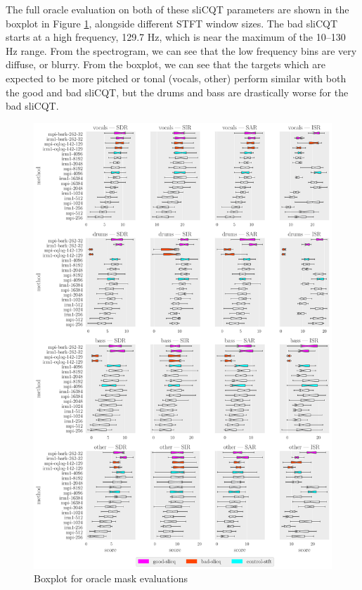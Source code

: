 \documentclass[report.tex]{subfiles}
\begin{document}
The full oracle evaluation on both of these sliCQT parameters are shown in the boxplot in Figure \ref{fig:oraclebssboxplot}, alongside different STFT window sizes. The bad sliCQT starts at a high frequency, 129.7 Hz, which is near the maximum of the 10--130 Hz range. From the spectrogram, we can see that the low frequency bins are very diffuse, or blurry. From the boxplot, we can see that the targets which are expected to be more pitched or tonal (vocals, other) perform similar with both the good and bad sliCQT, but the drums and bass are drastically worse for the bad sliCQT.

\begin{figure}[H]
	\centering
	\includegraphics[width=\textwidth]{./images-bss/oracle_boxplot.pdf}
	\caption{Boxplot for oracle mask evaluations}
	\label{fig:oraclebssboxplot}
\end{figure}
\end{document}
